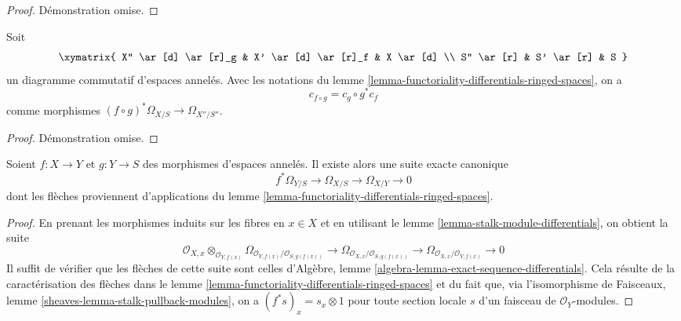 \begin{proof}
Démonstration omise.
\end{proof}

\begin{lemma}
\label{lemma-check-functoriality-differentials}
Soit
$$
\xymatrix{
X'' \ar[d] \ar[r]_g & X' \ar[d] \ar[r]_f & X \ar[d] \\
S'' \ar[r] & S' \ar[r] & S
}
$$
un diagramme commutatif d'espaces annelés. Avec les notations du lemme
\ref{lemma-functoriality-differentials-ringed-spaces}, on a
$$
c_{f \circ g} = c_g \circ g^* c_f
$$
comme morphismes $(f \circ g)^*\Omega_{X/S} \to \Omega_{X''/S''}$.
\end{lemma}

\begin{proof}
Démonstration omise.
\end{proof}

\begin{lemma}
\label{lemma-triangle-differentials}
Soient $f : X \to Y$ et $g : Y \to S$ des morphismes d'espaces annelés.
Il existe alors une suite exacte canonique
$$
f^*\Omega_{Y/S} \to \Omega_{X/S} \to \Omega_{X/Y} \to 0
$$
dont les flèches proviennent d'applications du lemme
\ref{lemma-functoriality-differentials-ringed-spaces}.
\end{lemma}

\begin{proof}
En prenant les morphismes induits sur les fibres en $x \in X$ et en utilisant
le lemme \ref{lemma-stalk-module-differentials}, on obtient la suite
$$
\mathcal{O}_{X, x} \otimes_{\mathcal{O}_{Y, f(x)}}
\Omega_{\mathcal{O}_{Y, f(x)}/\mathcal{O}_{S, g(f(x))}} \to
\Omega_{\mathcal{O}_{X, x}/\mathcal{O}_{S, g(f(x))}} \to
\Omega_{\mathcal{O}_{X, x}/\mathcal{O}_{Y, f(x)}} \to 0
$$
Il suffit de vérifier que les flèches de cette suite sont celles d'Algèbre,
lemme \ref{algebra-lemma-exact-sequence-differentials}. Cela résulte de la
caractérisation des flèches dans le lemme
\ref{lemma-functoriality-differentials-ringed-spaces} et du fait que,
via l'isomorphisme de Faisceaux, lemme
\ref{sheaves-lemma-stalk-pullback-modules}, on a
$(f^*s)_x = s_x \otimes 1$ pour toute section locale $s$ d'un faisceau de
$\mathcal{O}_Y$-modules.
\end{proof}


















